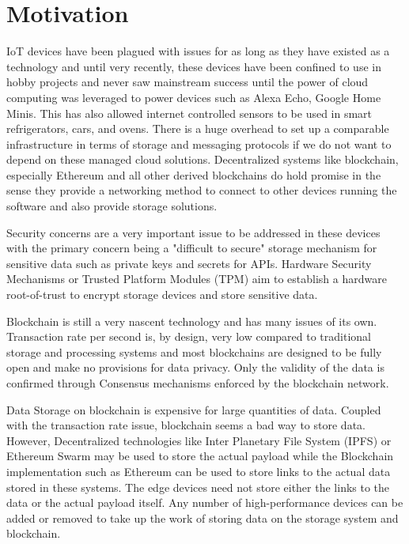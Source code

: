 \documentclass[11pt,openright]{report}
\begin{document}
\section{Motivation}\label{section:motivation}
IoT devices have been plagued with issues for as long as they have existed as a technology and until very recently, these devices have been confined to use in hobby projects and never saw mainstream success until the power of cloud computing was leveraged to power devices such as Alexa Echo, Google Home Minis. This has also allowed internet controlled sensors to be used in smart refrigerators, cars, and ovens. There is a huge overhead to set up a comparable infrastructure in terms of storage and messaging protocols if we do not want to depend on these managed cloud solutions. Decentralized systems like blockchain, especially Ethereum \cite{7467408}  and all other derived blockchains do hold promise in the sense they provide a networking method to connect to other devices running the software and also provide storage solutions.

Security concerns are a very important issue to be addressed in these devices with the primary concern being a "difficult to secure" storage mechanism for sensitive data such as private keys and secrets for APIs. Hardware Security Mechanisms or Trusted Platform Modules (TPM) aim to establish a hardware root-of-trust to encrypt storage devices and store sensitive data.

Blockchain is still a very nascent technology and has many issues of its own. Transaction rate per second is, by design, very low compared to traditional storage and processing systems and most blockchains are designed to be fully open and make no provisions for data privacy. Only the validity of the data is confirmed through Consensus mechanisms enforced by the blockchain network.

Data Storage on blockchain is expensive for large quantities of data. Coupled with the transaction rate issue, blockchain seems a bad way to store data. However, Decentralized technologies like Inter Planetary File System (IPFS) or Ethereum Swarm may be used to store the actual payload while the Blockchain implementation such as Ethereum can be used to store links to the actual data stored in these systems. The edge devices need not store either the links to the data or the actual payload itself. Any number of high-performance devices can be added or removed to take up the work of storing data on the storage system and blockchain. 
\end{document}
